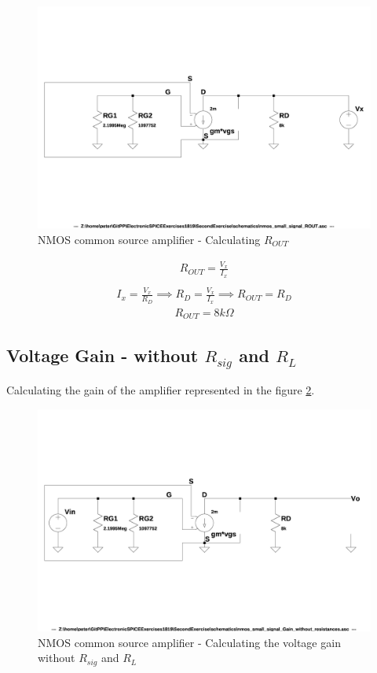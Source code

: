 \documentclass[10pt,a4paper]{book}
\begin{document}
\begin{figure}[h]
  \centering
  \includegraphics[width=12cm]{schematics/nmos_small_signal_ROUT.jpg}
  \caption{NMOS common source amplifier - Calculating $R_{OUT}$}
  \label{nmos_pi_ROUT}
\end{figure}

\begin{align}
R_{OUT} = \frac{V_x}{I_x}\\
\end{align}
\begin{align}
I_x = \frac{V_x}{R_D} \implies R_D = \frac{V_x}{I_x} \implies R_{OUT} = R_D 
\end{align}
\begin{align}
R_{OUT} = 8k\Omega
\end{align}

\subsection{Voltage Gain - without $R_{sig}$ and $R_L$}
Calculating the gain of the amplifier represented in the figure \ref{nmos_pi_gain_without_resistances}.

\begin{figure}[h]
  \centering
  \includegraphics[width=12cm]{schematics/nmos_small_signal_without_resistances.jpg}
  \caption{NMOS common source amplifier - Calculating the voltage gain without $R_{sig}$ and $R_L$}
  \label{nmos_pi_gain_without_resistances}
\end{figure}
\end{document}
